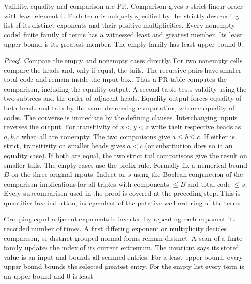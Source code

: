 \begin{theorem}\label{thm:order}
Validity, equality and comparison are PR. Comparison gives a strict linear order with least element $0$. Each term is uniquely specified by the strictly descending list of its distinct exponents and their positive multiplicities. Every nonempty coded finite family of terms has a witnessed least and greatest member. Its least upper bound is its greatest member. The empty family has least upper bound $0$.
\end{theorem}
\begin{proof}
Compare the empty and nonempty cases directly. For two nonempty cells compare the heads and, only if equal, the tails. The recursive pairs have smaller total code and remain inside the input box. Thus a PR table computes the comparison, including the equality output. A second table tests validity using the two subtrees and the order of adjacent heads. Equality output forces equality of both heads and tails by the same decreasing computation, whence equality of codes. The converse is immediate by the defining clauses. Interchanging inputs reverses the output. For transitivity of $x<y<z$ write their respective heads as $a,b,c$ when all are nonempty. The two comparisons give $a\le b\le c$. If either is strict, transitivity on smaller heads gives $a<c$ (or substitution does so in an equality case). If both are equal, the two strict tail comparisons give the result on smaller tails. The empty cases use the prefix rule. Formally fix a numerical bound $B$ on the three original inputs. Induct on $s$ using the Boolean conjunction of the comparison implications for all triples with components $\le B$ and total code $\le s$. Every subcomparison used in the proof is covered at the preceding step. This is quantifier-free induction, independent of the putative well-ordering of the terms.

Grouping equal adjacent exponents is inverted by repeating each exponent its recorded number of times. A first differing exponent or multiplicity decides comparison, so distinct grouped normal forms remain distinct. A scan of a finite family updates the index of its current extremum. The invariant says its stored value is an input and bounds all scanned entries. For a least upper bound, every upper bound bounds the selected greatest entry. For the empty list every term is an upper bound and $0$ is least.
\end{proof}

